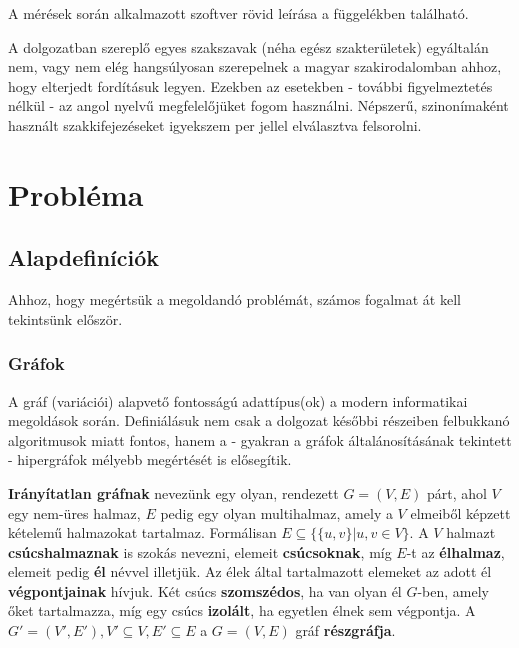 A mérések során alkalmazott szoftver rövid leírása a függelékben található.

\begin{note}
A dolgozatban szereplő egyes szakszavak (néha egész szakterületek) egyáltalán nem, vagy nem elég hangsúlyosan szerepelnek a magyar szakirodalomban ahhoz, hogy elterjedt fordításuk legyen. Ezekben az esetekben - további figyelmeztetés nélkül - az angol nyelvű megfelelőjüket fogom használni. Népszerű, szinonímaként használt szakkifejezéseket igyekszem per jellel elválasztva felsorolni.
\end{note}

\section{Probléma}

\subsection{Alapdefiníciók}

Ahhoz, hogy megértsük a megoldandó problémát, számos fogalmat át kell tekintsünk először.

\subsubsection{Gráfok}

A gráf (variációi) alapvető fontosságú adattípus(ok) a modern informatikai megoldások során. Definiálásuk nem csak a dolgozat későbbi részeiben felbukkanó algoritmusok miatt fontos, hanem a - gyakran a gráfok általánosításának tekintett - hipergráfok mélyebb megértését is elősegítik. 

\begin{definition}
\textbf{Irányítatlan gráfnak} nevezünk egy olyan, rendezett $G=(V,E)$ párt, ahol $V$ egy nem-üres halmaz, $E$ pedig egy olyan multihalmaz, amely a $V$ elmeiből képzett kételemű halmazokat tartalmaz. Formálisan $E \subseteq \{\{u,v\} | u,v \in V\}$. A $V$ halmazt \textbf{csúcshalmaznak} is szokás nevezni, elemeit \textbf{csúcsoknak}, míg $E$-t az \textbf{élhalmaz}, elemeit pedig \textbf{él} névvel illetjük. Az élek által tartalmazott elemeket az adott él \textbf{végpontjainak} hívjuk. Két csúcs \textbf{szomszédos}, ha van olyan él $G$-ben, amely őket tartalmazza, míg egy csúcs \textbf{izolált}, ha egyetlen élnek sem végpontja. A $G'=(V',E'), V' \subseteq V, E' \subseteq E$ a $G=(V,E)$ gráf \textbf{részgráfja}.
\end{definition}

